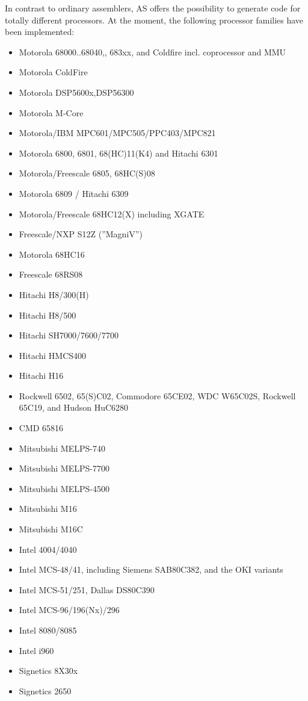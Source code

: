 \documentclass[12pt,twoside]{report}
\begin{document}
In contrast to ordinary assemblers, AS offers the possibility to
generate code for totally different processors.  At the moment, the
following processor families have been implemented:
\begin{itemize}
\item{Motorola 68000..68040,, 683xx, and Coldfire incl. coprocessor and MMU}
\item{Motorola ColdFire}
\item{Motorola DSP5600x,DSP56300}\item{Motorola M-Core}
\item{Motorola/IBM MPC601/MPC505/PPC403/MPC821}
\item{Motorola 6800, 6801, 68(HC)11(K4) and Hitachi 6301}
\item{Motorola/Freescale 6805, 68HC(S)08}
\item{Motorola 6809 / Hitachi 6309}
\item{Motorola/Freescale 68HC12(X) including XGATE}
\item{Freescale/NXP S12Z (''MagniV'')}
\item{Motorola 68HC16}
\item{Freescale 68RS08}
\item{Hitachi H8/300(H)}
\item{Hitachi H8/500}
\item{Hitachi SH7000/7600/7700}
\item{Hitachi HMCS400}
\item{Hitachi H16}
\item{Rockwell 6502, 65(S)C02, Commodore 65CE02, WDC W65C02S, Rockwell 65C19, and
      Hudson HuC6280}
\item{CMD 65816}
\item{Mitsubishi MELPS-740}
\item{Mitsubishi MELPS-7700}
\item{Mitsubishi MELPS-4500}
\item{Mitsubishi M16}
\item{Mitsubishi M16C}
\item{Intel 4004/4040}
\item{Intel MCS-48/41, including Siemens SAB80C382, and the OKI
      variants}
\item{Intel MCS-51/251, Dallas DS80C390}
\item{Intel MCS-96/196(Nx)/296}
\item{Intel 8080/8085}
\item{Intel i960}
\item{Signetics 8X30x}
\item{Signetics 2650}

\end{itemize}
\end{document}

